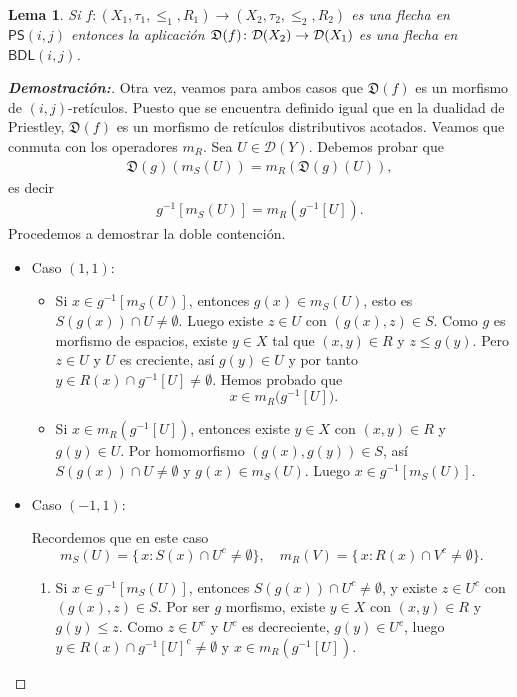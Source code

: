 \documentclass[12pt]{book}
\newtheorem{lemma}[theorem]{Lema}
\newcommand{\BDL}{\mathsf{BDL}}
\newcommand{\PS}{\mathsf{PS}}
\newcommand{\D}{\mathfrak{D}}
\begin{document}
\begin{lemma}\label{Lema de Functorialidad para D} Si $f: (X_{1}, \tau_{1}, \leq_{1}, R_{1}) \to (X_{2}, \tau_{2}, \leq_{2}, R_{2})$ es una flecha en $\PS(i,j)$ entonces la aplicación $\D(f) \colon {\cal{D}}(X_{2})\to {\cal{D}}(X_{1})$ es una flecha en $\BDL(i,j)$.
\end{lemma}
\begin{proof}[{\textbf{Demostración:}}]Otra vez, veamos para ambos casos que $\D(f)$ es un morfismo de $(i, j)$-retículos. Puesto que se encuentra definido igual que en la dualidad de Priestley, $\D(f)$ es un morfismo de retículos distributivos acotados. Veamos que conmuta con los operadores $m_R$. Sea $U\in \mathcal{D}(Y)$. Debemos probar que
\begin{align*}
\D(g)(m_S(U)) = m_R(\D(g)(U)),
\end{align*}
es decir
\begin{align*}
g^{-1}[m_S(U)] = m_R(g^{-1}[U]).
\end{align*}
Procedemos a demostrar la doble contención.

\medskip
\begin{itemize}
    \item Caso $(1,1)$: 

\begin{itemize}
  \item[$\subseteq$)] Si \(x\in g^{-1}[m_{S}(U)]\), entonces \(g(x)\in m_{S}(U)\), esto es \(S(g(x))\cap U\neq\emptyset\). Luego existe \(z\in U\) con \((g(x),z)\in S\). Como \(g\) es morfismo de espacios, existe \(y\in X\) tal que \((x,y)\in R\) y \(z\le g(y)\). Pero \(z\in U\) y \(U\) es creciente, así \(g(y)\in U\) y por tanto \(y\in R(x)\cap g^{-1}[U]\neq\emptyset\). Hemos probado que 
  \[
    x\in m_{R}\bigl(g^{-1}[U]\bigr).
  \]

  \item[$\supseteq$)] Si \(x\in m_{R}(g^{-1}[U])\), entonces existe \(y\in X\) con \((x,y)\in R\) y \(g(y)\in U\). Por homomorfismo \((g(x),g(y))\in S\), así \(S(g(x))\cap U\neq\emptyset\) y \(g(x)\in m_{S}(U)\). Luego \(x\in g^{-1}[m_{S}(U)]\).
\end{itemize}

\medskip

\item Caso $(-1,1)$: 

Recordemos que en este caso
\[
m_{S}(U)=\{\,x: S(x)\cap U^{c}\neq\emptyset\},
\quad
m_{R}(V)=\{\,x: R(x)\cap V^{c}\neq\emptyset\}.
\]

\begin{enumerate}
  \item[$\subseteq$)] Si \(x\in g^{-1}[m_{S}(U)]\), entonces \(S(g(x))\cap U^{c}\neq\emptyset\), y existe \(z\in U^{c}\) con \((g(x),z)\in S\). Por ser $g$ morfismo, existe \(y\in X\) con \((x,y)\in R\) y \(g(y)\le z\). Como \(z\in U^c\) y \(U^c\) es decreciente, \(g(y)\in U^c\), luego \(y\in R(x)\cap g^{-1}[U]^{c}\neq\emptyset\) y \(x\in m_{R}(g^{-1}[U])\).


\end{enumerate}
\end{itemize}
\end{proof}
\end{document}
